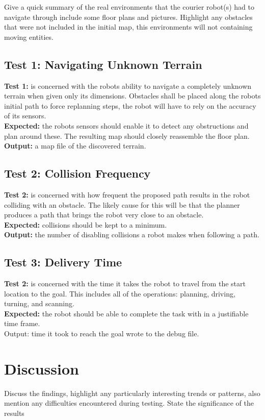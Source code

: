 Give a quick summary of the real environments that the courier robot(s) had to navigate through include some floor plans and pictures. Highlight any obstacles that were not included in the initial map, this environments will not containing moving entities.

\subsection{Test 1: Navigating Unknown Terrain}

\noindent
\textbf{Test 1:} is concerned with the robots ability to navigate a completely unknown terrain when given only its dimensions. Obstacles shall be placed along the robots initial path to force replanning steps, the robot will have to rely on the accuracy of its sensors.\\

\noindent
\textbf{Expected:} the robots sensors should enable it to detect any obstructions and plan around these. The resulting map should closely reassemble the floor plan.\\

\noindent
\textbf{Output:} a map file of the discovered terrain.

\subsection{Test 2: Collision Frequency}

\noindent
\textbf{Test 2:} is concerned with how frequent the proposed path results in the robot colliding with an obstacle. The likely cause for this will be that the planner produces a path that brings the robot very close to an obstacle.\\

\noindent
\textbf{Expected:} collisions should be kept to a minimum.\\

\noindent
\textbf{Output:} the number of disabling collisions a robot makes when following a path.

\subsection{Test 3: Delivery Time}

\noindent
\textbf{Test 2:} is concerned with the time it takes the robot to travel from the start location to the goal. This includes all of the operations: planning, driving, turning, and scanning.\\

\noindent
\textbf{Expected:} the robot should be able to complete the task with in a justifiable time frame.\\

\noindent
Output: time it took to reach the goal wrote to the debug file.

\section{Discussion}
Discuss the findings, highlight any particularly interesting trends or patterns, also mention any difficulties encountered during testing. State the significance of the results